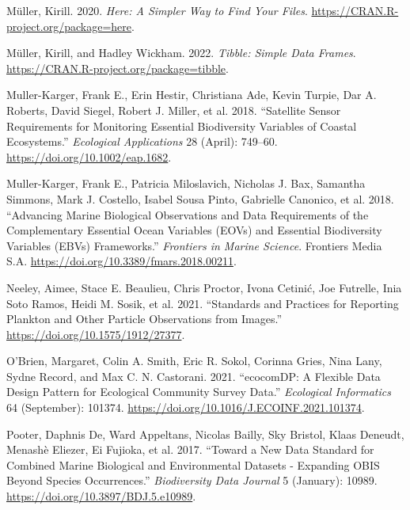 \documentclass[
]{book}
\newlength{\cslhangindent}
\newlength{\cslentryspacingunit} %
\newenvironment{CSLReferences}[2] %
 {%
  \setlength{\parindent}{0pt}
  \ifodd #1
  \let\oldpar\par
  \def\par{\hangindent=\cslhangindent\oldpar}
  \fi
  \setlength{\parskip}{#2\cslentryspacingunit}
 }%
 {}
\begin{document}
\begin{CSLReferences}{1}{0}
\leavevmode{}%
Müller, Kirill. 2020. \emph{Here: A Simpler Way to Find Your Files}. \url{https://CRAN.R-project.org/package=here}.

\leavevmode{}%
Müller, Kirill, and Hadley Wickham. 2022. \emph{Tibble: Simple Data Frames}. \url{https://CRAN.R-project.org/package=tibble}.

\leavevmode{}%
Muller-Karger, Frank E., Erin Hestir, Christiana Ade, Kevin Turpie, Dar A. Roberts, David Siegel, Robert J. Miller, et al. 2018. {``Satellite Sensor Requirements for Monitoring Essential Biodiversity Variables of Coastal Ecosystems.''} \emph{Ecological Applications} 28 (April): 749--60. \url{https://doi.org/10.1002/eap.1682}.

\leavevmode{}%
Muller-Karger, Frank E., Patricia Miloslavich, Nicholas J. Bax, Samantha Simmons, Mark J. Costello, Isabel Sousa Pinto, Gabrielle Canonico, et al. 2018. {``Advancing Marine Biological Observations and Data Requirements of the Complementary Essential Ocean Variables (EOVs) and Essential Biodiversity Variables (EBVs) Frameworks.''} \emph{Frontiers in Marine Science}. Frontiers Media S.A. \url{https://doi.org/10.3389/fmars.2018.00211}.

\leavevmode{}%
Neeley, Aimee, Stace E. Beaulieu, Chris Proctor, Ivona Cetinić, Joe Futrelle, Inia Soto Ramos, Heidi M. Sosik, et al. 2021. {``Standards and Practices for Reporting Plankton and Other Particle Observations from Images.''} \url{https://doi.org/10.1575/1912/27377}.

\leavevmode{}%
O'Brien, Margaret, Colin A. Smith, Eric R. Sokol, Corinna Gries, Nina Lany, Sydne Record, and Max C. N. Castorani. 2021. {``ecocomDP: A Flexible Data Design Pattern for Ecological Community Survey Data.''} \emph{Ecological Informatics} 64 (September): 101374. \url{https://doi.org/10.1016/J.ECOINF.2021.101374}.

\leavevmode{}%
Pooter, Daphnis De, Ward Appeltans, Nicolas Bailly, Sky Bristol, Klaas Deneudt, Menashè Eliezer, Ei Fujioka, et al. 2017. {``Toward a New Data Standard for Combined Marine Biological and Environmental Datasets - Expanding OBIS Beyond Species Occurrences.''} \emph{Biodiversity Data Journal} 5 (January): 10989. \url{https://doi.org/10.3897/BDJ.5.e10989}.


\end{CSLReferences}
\end{document}
